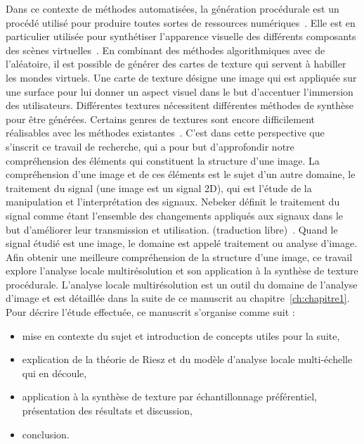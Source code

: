 Dans ce contexte de méthodes automatisées, la génération procédurale est un procédé utilisé pour produire toutes sortes de ressources numériques~\cite{smelik_survey_2014}. Elle est en particulier utilisée pour synthétiser l'apparence visuelle des différents composants des scènes virtuelles~\cite{alessio_procedural_2021}. En combinant des méthodes algorithmiques avec de l'aléatoire, il est possible de générer des cartes de texture qui servent à habiller les mondes virtuels. Une carte de texture désigne une image qui est appliquée sur une surface pour lui donner un aspect visuel dans le but d'accentuer l'immersion des utilisateurs. Différentes textures nécessitent différentes méthodes de synthèse pour être générées. Certains genres de textures sont encore difficilement réalisables avec les méthodes existantes~\cite{lutz_cyclostationary-gaussian_2021}. C'est dans cette perspective que s'inscrit ce travail de recherche, qui a pour but d'approfondir notre compréhension des éléments qui constituent la structure d'une image. La compréhension d'une image et de ces éléments est le sujet d'un autre domaine, le traitement du signal (une image est un signal 2D), qui est l'étude de la manipulation et l'interprétation des signaux. Nebeker définit le traitement du signal comme étant \og [...] l'ensemble des changements appliqués aux signaux dans le but d'améliorer leur transmission et utilisation. \fg (traduction libre)~\cite{nebeker_fifty_1998}. Quand le signal étudié est une image, le domaine est appelé traitement ou analyse d'image. Afin obtenir une meilleure compréhension de la structure d'une image, ce travail explore l'analyse locale multirésolution et son application à la synthèse de texture procédurale. L'analyse locale multirésolution est un outil du domaine de l'analyse d'image et est détaillée dans la suite de ce manuscrit au chapitre~\ref{ch:chapitre1}. Pour décrire l'étude effectuée, ce manuscrit s'organise comme suit :

\begin{itemize}
    \item mise en contexte du sujet et introduction de concepts utiles pour la suite,
    \item explication de la théorie de Riesz et du modèle d'analyse locale multi-échelle qui en découle,
    \item application à la synthèse de texture par échantillonnage préférentiel, présentation des résultats et discussion,
    \item conclusion.
\end{itemize}
